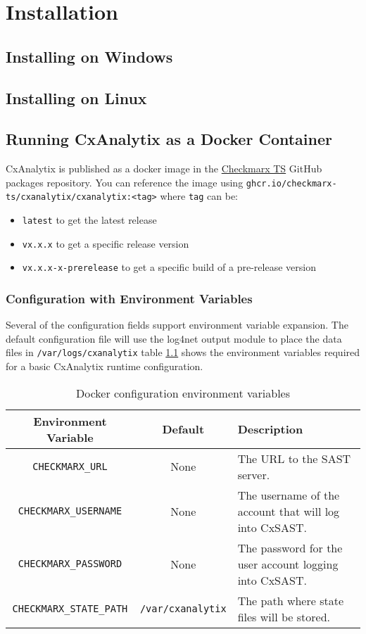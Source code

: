 \chapter{Installation}


\section{Installing on Windows}
\section{Installing on Linux}
\section{Running CxAnalytix as a Docker Container}

CxAnalytix is published as a docker image in the \href{https://github.com/checkmarx-ts/CxAnalytix/pkgs/container/cxanalytix%2Fcxanalytix}{Checkmarx TS} GitHub 
packages repository. You can reference the image using \verb|ghcr.io/checkmarx-ts/cxanalytix/cxanalytix:<tag>| where \verb|tag| can be:

\begin{itemize}
    \item \verb|latest| to get the latest release
    \item \verb|vx.x.x| to get a specific release version
    \item \verb|vx.x.x-x-prerelease| to get a specific build of a pre-release version
\end{itemize}

\subsection{Configuration with Environment Variables}

Several of the configuration fields support environment variable expansion.  The default configuration file will use the log4net output
module to place the data files in \verb|/var/logs/cxanalytix| table \ref{tab:env} shows the environment variables required for a 
basic CxAnalytix runtime configuration.

\begin{table}
    \centering
    \begin{tabular}{|c|c|l|}
        \toprule
        \textbf{Environment Variable} & \textbf{Default} & \textbf{Description}\\
        \midrule
        \verb|CHECKMARX_URL| & None & The URL to the SAST server.\\
        \midrule
        \verb|CHECKMARX_USERNAME| & None & The username of the account that will log into CxSAST.\\
        \midrule
        \verb|CHECKMARX_PASSWORD| & None & The password for the user account logging into CxSAST.\\
        \midrule
        \verb|CHECKMARX_STATE_PATH| & \verb|/var/cxanalytix| & The path where state files will be stored.\\
        \bottomrule
    \end{tabular}
    \caption{Docker configuration environment variables}
    \label{tab:env}
\end{table}
    
